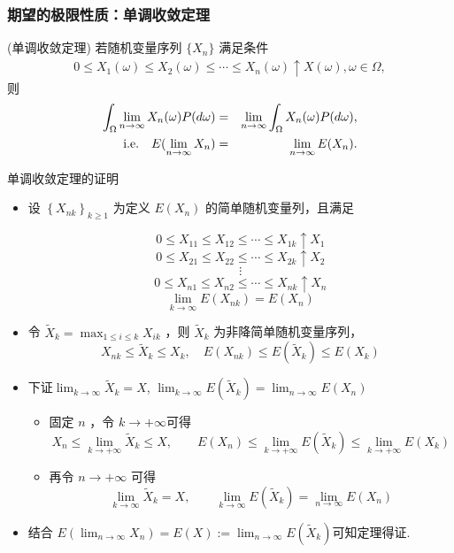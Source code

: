 	\begin{frame}
		\frametitle{期望的极限性质：单调收敛定理}
		\begin{thm}
			(单调收敛定理) 若随机变量序列 $\{X_n\}$ 满足条件
			\begin{eqnarray*}
				0\leq X_1(\omega)\leq X_2(\omega)\leq \cdots \leq X_n(\omega)\uparrow X(\omega), \omega\in \Omega,
			\end{eqnarray*}
			则
			\begin{eqnarray*}
				\int_{\Omega}\lim_{n\rightarrow\infty}X_n(\omega)P(d\omega)&=& \lim_{n\rightarrow\infty}\int_\Omega X_n(\omega)P(d\omega), \\
				{\rm i.e.} \quad    E(\lim_{n\rightarrow\infty}X_n)&=&\lim_{n\rightarrow\infty}E(X_n).
			\end{eqnarray*}

		\end{thm}

	\end{frame}

	\begin{frame}[allowframebreaks]{单调收敛定理的证明}
	\begin{itemize}
		\item 设 $\left\{X_{n k}\right\}_{k \geqslant 1}$ 为定义 $E\left(X_{n}\right)$ 的简单随机变量列，且满足

		\[0 \leqslant X_{11} \leqslant X_{12} \leqslant \cdots \leqslant X_{1 k} \uparrow X_{1} \]
		\[0 \leqslant X_{21} \leqslant X_{22} \leqslant \cdots \leqslant X_{2 k} \uparrow X_{2} \]
		\[\vdots\]
		\[0 \leqslant X_{n 1} \leqslant X_{n 2} \leqslant \cdots \leqslant X_{n k} \uparrow X_{n} \]
		\[\lim _{k \rightarrow \infty} E\left(X_{n k}\right)=E\left(X_{n}\right)\]

		\item 令 $\widetilde{X}_{k}=\max _{1 \leqslant i \leqslant k} X_{i k}$ ，则 $\widetilde{X}_{k}$ 为非降简单随机变量序列，
		\[
		X_{n k} \leqslant \widetilde{X}_{k} \leqslant X_{k}, \quad  E\left(X_{n k}\right) \leq E\left(\widetilde{X}_{k}\right) \leq E\left(X_{k}\right)
		\]
		\framebreak
        \item 下证$\lim _{k \rightarrow \infty} \widetilde{X}_{k}=X$, $\lim _{k \rightarrow \infty}E(\widetilde{X}_{k})=\lim_{n\rightarrow\infty}E(X_n)$

		\begin{itemize}
			\item 固定 $n$ ，令 $k \rightarrow+\infty$可得
			\[
			X_{n} \leq \lim _{k \rightarrow+\infty} \widetilde{X}_{k} \leq X, \qquad   E\left(X_{n}\right) \leq \lim _{k \rightarrow+\infty} E\left(\widetilde{X}_{k}\right) \leq \lim _{k \rightarrow+\infty}E{(X_k)}
			\]

			\item 再令 $n \rightarrow+\infty$ 可得
			\[
			\lim _{k \rightarrow \infty} \widetilde{X}_{k}=X, \qquad  \lim _{k \rightarrow \infty}E(\widetilde{X}_{k})=\lim_{n\rightarrow\infty}E(X_n)
			\]
		\end{itemize}
\item 结合 $E(\lim_{n\rightarrow\infty}X_n)=E(X):=\lim_{n\rightarrow\infty}E(\widetilde{X}_k)$可知定理得证.
	\end{itemize}

	\end{frame}

